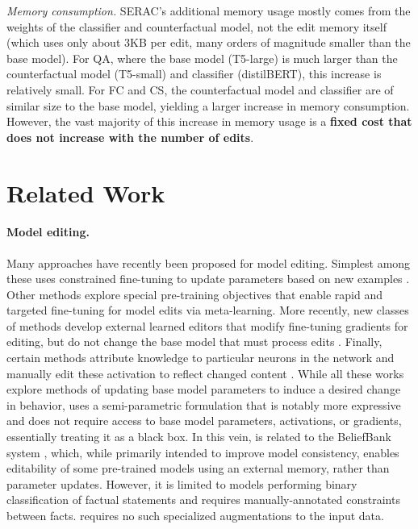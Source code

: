 \documentclass{article}
\begin{document}
\textit{Memory consumption.} SERAC's additional memory usage mostly comes from the weights of the classifier and counterfactual model, not the edit memory itself (which uses only about 3KB per edit, many orders of magnitude smaller than the base model). For QA, where the base model (T5-large) is much larger than the counterfactual model (T5-small) and classifier (distilBERT), this increase is relatively small. For FC and CS, the counterfactual model and classifier are of similar size to the base model, yielding a larger increase in memory consumption. However, the vast majority of this increase in memory usage is a \textbf{fixed cost that does not increase with the number of edits}.



\section{Related Work}

\paragraph{Model editing.} Many approaches have recently been proposed for model editing. Simplest among these uses constrained fine-tuning to update parameters based on new examples \citep{sotoudeh2019correcting,zhu2020modifying}. Other methods explore special pre-training objectives that enable rapid and targeted  
fine-tuning for model edits \citep{Sinitsin2020Editable} via meta-learning. More recently, new classes of methods develop external learned editors that modify fine-tuning gradients for editing, but do not change the base model that must process edits \citep{Cao2021EditingFK,mitchell2021fast,hase2021language}. Finally, certain methods attribute knowledge to particular neurons in the network and manually edit these activation to reflect changed content \citep{dai2021knowledge,meng2022locating}. While all these works explore methods of updating base model parameters to induce a desired change in behavior, {\name} uses a semi-parametric formulation that is notably more expressive and does not require access to base model parameters, activations, or gradients, essentially treating it as a black box. In this vein, {\name} is related to the BeliefBank system \citep{kassner-etal-2021-beliefbank}, which, while primarily intended to improve model consistency, enables editability of some pre-trained models using an external memory, rather than parameter updates. However, it is limited to models performing binary classification of factual statements and requires manually-annotated constraints between facts. {\name} requires no such specialized augmentations to the input data.
\end{document}

